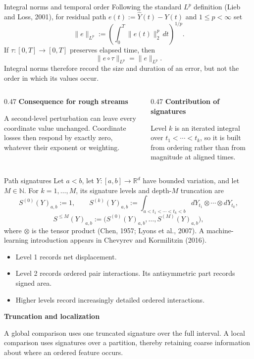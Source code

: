 \documentclass[aspectratio=169,9pt]{beamer}
\begin{document}
\begin{frame}{Integral norms and temporal order}
  Following the standard $L^p$ definition (Lieb and Loss, 2001), for residual path $e(t):=\widehat Y(t)-Y(t)$ and $1\leq p<\infty$ set
  \[
    \|e\|_{L^p}:=
    \left(\int_0^T\|e(t)\|_2^p\,dt\right)^{1/p}.
  \]
  If $\tau:[0,T]\to[0,T]$ preserves elapsed time, then
  \[
    \|e\circ\tau\|_{L^p}=\|e\|_{L^p}.
  \]
  Integral norms therefore record the size and duration of an error, but not the order in which its values occur.

  \vfill
  \begin{columns}[T,onlytextwidth]
    \begin{column}{0.47\textwidth}
      \textbf{Consequence for rough streams}\par
      A second-level perturbation can leave every coordinate value unchanged. Coordinate losses then respond by exactly zero, whatever their exponent or weighting.
    \end{column}
    \begin{column}{0.47\textwidth}
      \textbf{Contribution of signatures}\par
      Level $k$ is an iterated integral over $t_1<\cdots<t_k$, so it is built from ordering rather than from magnitude at aligned times.
    \end{column}
  \end{columns}
\end{frame}

\begin{frame}{Path signatures}
  Let $a<b$, let $Y:[a,b]\to\mathbb R^d$ have bounded variation, and let $M\in\mathbb N$. For $k=1,\ldots,M$, its signature levels and depth-$M$ truncation are
  \[
    S^{(0)}(Y)_{a,b}:=1,
    \qquad
    S^{(k)}(Y)_{a,b}
    :=\int_{a<t_1<\cdots<t_k<b}
      dY_{t_1}\otimes\cdots\otimes dY_{t_k},
  \]
  \[
    S^{\le M}(Y)_{a,b}:=
    \bigl(S^{(0)}(Y)_{a,b},\ldots,S^{(M)}(Y)_{a,b}\bigr),
  \]
  where $\otimes$ is the tensor product (Chen, 1957; Lyons et al., 2007). A machine-learning introduction appears in Chevyrev and Kormilitzin (2016).
  \begin{itemize}
    \item Level 1 records net displacement.
    \item Level 2 records ordered pair interactions. Its antisymmetric part records signed area.
    \item Higher levels record increasingly detailed ordered interactions.
  \end{itemize}
  \textbf{Truncation and localization}\par
  A global comparison uses one truncated signature over the full interval. A local comparison uses signatures over a partition, thereby retaining coarse information about where an ordered feature occurs.
\end{frame}
\end{document}
